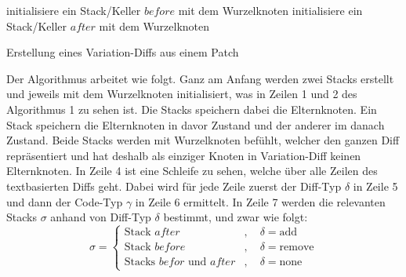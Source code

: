 \begin{algorithm}[H]
	\SetAlgoLined
	\DontPrintSemicolon
	initialisiere ein Stack/Keller $before$ mit dem Wurzelknoten\;
	initialisiere ein Stack/Keller $after$ mit dem Wurzelknoten\;
	\;
	\caption{Erstellung eines Variation-Diffs aus einem Patch}
\end{algorithm}
Der Algorithmus arbeitet wie folgt. Ganz am Anfang werden zwei Stacks erstellt und jeweils mit dem Wurzelknoten initialisiert, was in Zeilen 1 und 2 des Algorithmus 1 zu sehen ist. Die Stacks speichern dabei die Elternknoten. Ein Stack speichern die Elternknoten in davor Zustand und der anderer im danach Zustand. Beide Stacks werden mit Wurzelknoten befühlt, welcher den ganzen Diff repräsentiert und hat deshalb als einziger Knoten in Variation-Diff keinen Elternknoten. In Zeile 4 ist eine Schleife zu sehen, welche über alle Zeilen des textbasierten Diffs geht. Dabei wird für jede Zeile zuerst der Diff-Typ $\delta$ in Zeile 5 und dann der Code-Typ $\gamma$ in Zeile 6 ermittelt. In Zeile 7 werden die relevanten Stacks $\sigma$ anhand von Diff-Typ $\delta$ bestimmt, und zwar wie folgt:
\[ \sigma =
\begin{cases}
	\text{Stack } after      &, \quad \delta = \text{add}\\
	\text{Stack } before  &, \quad \delta = \text{remove}\\
	\text{Stacks } befor \text{ und } after &, \quad \delta = \text{none}
\end{cases}
\]
